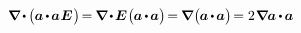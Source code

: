 \begin{equation*}
\boldnabla \hspace{-0.16ex} \dotp \hspace{-0.12ex} \bigl( \hspace{-0.05ex} \bm{a} \hspace{-0.17ex} \dotp \hspace{-0.2ex} \bm{a} \hspace{.1ex} \bm{E} \hspace{.12ex} \bigr) \hspace{-0.33ex}
= \hspace{-0.15ex} \boldnabla \hspace{-0.2ex} \dotp \hspace{-0.22ex}  \bm{E} \hspace{.13ex} \bigl( \hspace{-0.1ex} \bm{a} \hspace{-0.17ex} \dotp \hspace{-0.2ex} \bm{a} \bigr) \hspace{-0.33ex}
= \hspace{-0.15ex} \boldnabla \hspace{.1ex} \bigl( \hspace{-0.1ex} \bm{a} \hspace{-0.17ex} \dotp \hspace{-0.2ex} \bm{a} \bigr) \hspace{-0.33ex}
= 2 \hspace{.16ex} \boldnabla \hspace{-0.1ex} \bm{a} \hspace{-0.12ex} \dotp \hspace{-0.15ex} \bm{a}
\end{equation*}

